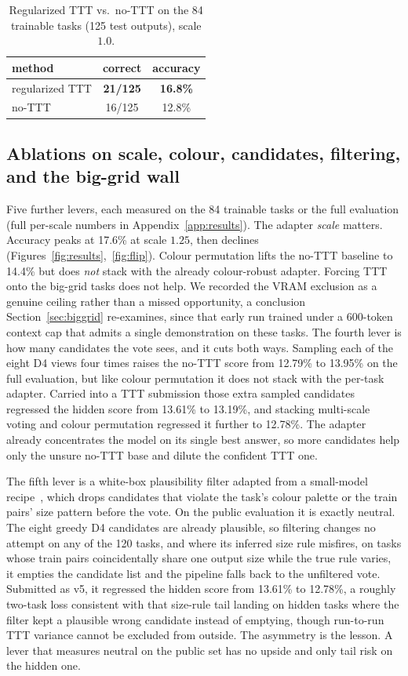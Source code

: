 \documentclass[11pt]{article}
\begin{document}
\begin{table}[H]
\centering
\caption{Regularized TTT vs.\ no-TTT on the 84 trainable tasks (125 test outputs), scale $1.0$.}
\label{tab:scale}
\begin{tabular}{lcc}
\toprule
method & correct & accuracy \\
\midrule
regularized TTT & \textbf{21/125} & \textbf{16.8\%} \\
no-TTT          & 16/125 & 12.8\% \\
\bottomrule
\end{tabular}
\end{table}

\subsection{Ablations on scale, colour, candidates, filtering, and the big-grid wall}
\label{sec:ablations}
Five further levers, each measured on the 84 trainable tasks or the full evaluation (full per-scale
numbers in Appendix~\ref{app:results}). The adapter \emph{scale} matters. Accuracy peaks at 17.6\% at
scale $1.25$, then declines (Figures~\ref{fig:results},~\ref{fig:flip}). Colour permutation lifts the
no-TTT baseline to 14.4\% but does \emph{not} stack with the already colour-robust adapter. Forcing
TTT onto the big-grid tasks does not help. We recorded the VRAM exclusion as a genuine ceiling rather than
a missed opportunity, a conclusion Section~\ref{sec:biggrid} re-examines, since that early run trained under
a 600-token context cap that admits a single demonstration on these tasks. The fourth lever is how many candidates the vote sees, and it cuts both ways. Sampling each of
the eight D4 views four times raises the no-TTT score from 12.79\% to 13.95\% on the full evaluation, but
like colour permutation it does not stack with the per-task adapter. Carried into a TTT submission those
extra sampled candidates regressed the hidden score from 13.61\% to 13.19\%, and stacking multi-scale voting
and colour permutation regressed it further to 12.78\%. The adapter already concentrates the model on its
single best answer, so more candidates help only the unsure no-TTT base and dilute the confident TTT one.

The fifth lever is a white-box plausibility filter adapted from a small-model recipe~\cite{longt5arc},
which drops candidates that violate the task's colour palette or the train pairs' size pattern before
the vote. On the public evaluation it is exactly neutral. The eight greedy D4 candidates are already
plausible, so filtering changes no attempt on any of the 120 tasks, and where its inferred size rule
misfires, on tasks whose train pairs coincidentally share one output size while the true rule varies,
it empties the candidate list and the pipeline falls back to the unfiltered vote. Submitted as v5, it
regressed the hidden score from 13.61\% to 12.78\%, a roughly two-task loss consistent with that
size-rule tail landing on hidden tasks where the filter kept a plausible wrong candidate instead of
emptying, though run-to-run TTT variance cannot be excluded from outside. The asymmetry is the lesson.
A lever that measures neutral on the public set has no upside and only tail risk on the hidden one.
\end{document}
